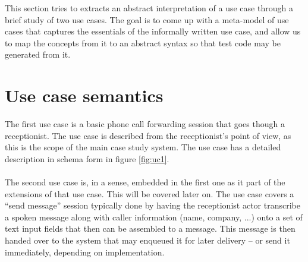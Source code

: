 
This section tries to extracts an abstract interpretation of a use case through a brief study of two use cases. The goal is to come up with a meta-model of use cases that captures the essentials of the informally written use case, and allow us to map the concepts from it to an abstract syntax so that test code may be generated from it.
\section{Use case semantics}
The first use case is a basic phone call forwarding session that goes though a receptionist. The use case is described from the receptionist's point of view, as this is the scope of the main case study system. The use case has a detailed description in schema form in figure \ref{fig:uc1}. \\\\
The second use case is, in a sense, embedded in the first one as it part of the extensions of that use case. This will be covered later on. The use case covers a ``send message'' session typically done by having the receptionist actor transcribe a spoken message along with caller information (name, company, ...) onto a set of text input fields that then can be assembled to a message. This message is then handed over to the system that may enqueued it for later delivery -- or send it immediately, depending on implementation.


